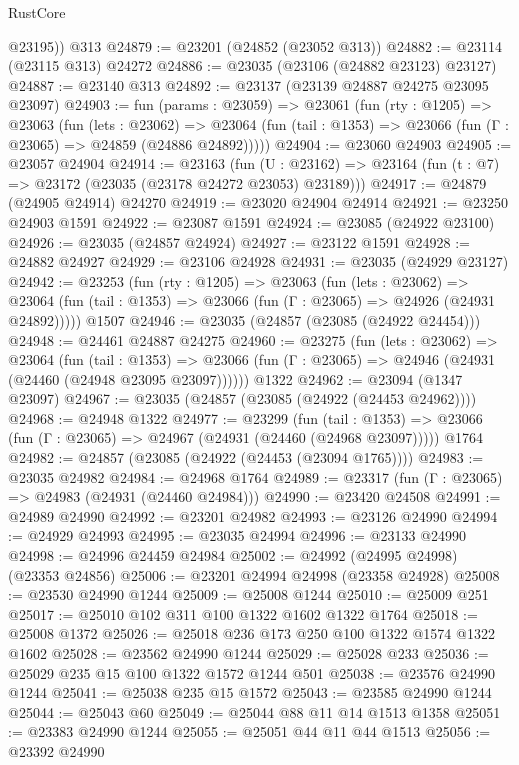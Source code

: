 \begin{lexlean}{RustCore}
\begin{coremodule}
        @23195))
    @313
@24879 := @23201 (@24852 (@23052 @313))
@24882 := @23114 (@23115 @313) @24272
@24886 := @23035 (@23106 (@24882 @23123) @23127)
@24887 := @23140 @313
@24892 := @23137 (@23139 @24887 @24275 @23095 @23097)
@24903 := fun (params : @23059) =>
  @23061
    (fun (rty : @1205) =>
    @23063
      (fun (lets : @23062) =>
      @23064 (fun (tail : @1353) => @23066 (fun (Γ : @23065) => @24859 (@24886 @24892)))))
@24904 := @23060 @24903
@24905 := @23057 @24904
@24914 := @23163
    (fun (U : @23162) => @23164 (fun (t : @7) => @23172 (@23035 (@23178 @24272 @23053) @23189)))
@24917 := @24879 (@24905 @24914) @24270
@24919 := @23020 @24904 @24914
@24921 := @23250 @24903 @1591
@24922 := @23087 @1591
@24924 := @23085 (@24922 @23100)
@24926 := @23035 (@24857 @24924)
@24927 := @23122 @1591
@24928 := @24882 @24927
@24929 := @23106 @24928
@24931 := @23035 (@24929 @23127)
@24942 := @23253
    (fun (rty : @1205) =>
    @23063
      (fun (lets : @23062) =>
      @23064 (fun (tail : @1353) => @23066 (fun (Γ : @23065) => @24926 (@24931 @24892)))))
    @1507
@24946 := @23035 (@24857 (@23085 (@24922 @24454)))
@24948 := @24461 @24887 @24275
@24960 := @23275
    (fun (lets : @23062) =>
    @23064
      (fun (tail : @1353) =>
      @23066 (fun (Γ : @23065) => @24946 (@24931 (@24460 (@24948 @23095 @23097))))))
    @1322
@24962 := @23094 (@1347 @23097)
@24967 := @23035 (@24857 (@23085 (@24922 (@24453 @24962))))
@24968 := @24948 @1322
@24977 := @23299
    (fun (tail : @1353) => @23066 (fun (Γ : @23065) => @24967 (@24931 (@24460 (@24968 @23097)))))
    @1764
@24982 := @24857 (@23085 (@24922 (@24453 (@23094 @1765))))
@24983 := @23035 @24982
@24984 := @24968 @1764
@24989 := @23317 (fun (Γ : @23065) => @24983 (@24931 (@24460 @24984)))
@24990 := @23420 @24508
@24991 := @24989 @24990
@24992 := @23201 @24982
@24993 := @23126 @24990
@24994 := @24929 @24993
@24995 := @23035 @24994
@24996 := @23133 @24990
@24998 := @24996 @24459 @24984
@25002 := @24992 (@24995 @24998) (@23353 @24856)
@25006 := @23201 @24994 @24998 (@23358 @24928)
@25008 := @23530 @24990 @1244
@25009 := @25008 @1244
@25010 := @25009 @251
@25017 := @25010 @102 @311 @100 @1322 @1602 @1322 @1764
@25018 := @25008 @1372
@25026 := @25018 @236 @173 @250 @100 @1322 @1574 @1322 @1602
@25028 := @23562 @24990 @1244
@25029 := @25028 @233
@25036 := @25029 @235 @15 @100 @1322 @1572 @1244 @501
@25038 := @23576 @24990 @1244
@25041 := @25038 @235 @15 @1572
@25043 := @23585 @24990 @1244
@25044 := @25043 @60
@25049 := @25044 @88 @11 @14 @1513 @1358
@25051 := @23383 @24990 @1244
@25055 := @25051 @44 @11 @44 @1513
@25056 := @23392 @24990

\end{coremodule}
\end{lexlean}
